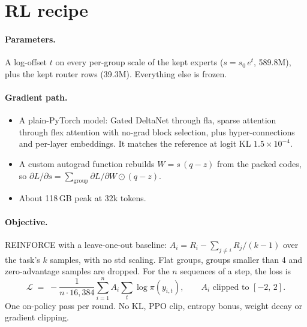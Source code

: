 \documentclass[10pt]{article}
\begin{document}
\section{RL recipe}\label{app:rl}

\paragraph{Parameters.} A log-offset $t$ on every per-group scale of the kept experts ($s = s_0\, e^{t}$, 589.8M),
plus the kept router rows (39.3M). Everything else is frozen.

\paragraph{Gradient path.}
\begin{itemize}
  \item A plain-PyTorch model: Gated DeltaNet through fla, sparse attention through flex attention with no-grad block
        selection, plus hyper-connections and per-layer embeddings. It matches the reference at logit KL
        $1.5\times10^{-4}$.
  \item A custom autograd function rebuilds $W = s\,(q - z)$ from the packed codes, so
        $\partial L/\partial s = \sum_{\text{group}} \partial L/\partial W \odot (q - z)$.
  \item About 118\,GB peak at 32k tokens.
\end{itemize}

\paragraph{Objective.} REINFORCE with a leave-one-out baseline: $A_i = R_i - \sum_{j \ne i} R_j / (k-1)$ over the
task's $k$ samples, with no std scaling. Flat groups, groups smaller than 4 and zero-advantage samples are dropped.
For the $n$ sequences of a step, the loss is
\begin{equation*}
  \mathcal{L} \;=\; -\frac{1}{n \cdot 16{,}384} \sum_{i=1}^{n} A_i \sum_{t} \log \pi(y_{i,t}),
  \qquad A_i \text{ clipped to } [-2,\, 2].
\end{equation*}
One on-policy pass per round. No KL, PPO clip, entropy bonus, weight decay or gradient clipping.
\end{document}
